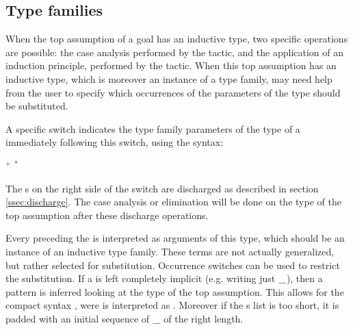 \subsection{Type families}\label{ssec:typefam}

When the top assumption of a goal has an inductive type, two
specific operations are possible: the case analysis performed by the
 tactic, and the application of an induction principle,
performed by the  tactic. When this top assumption has an
inductive type, which is moreover an instance of a type family, \Coq{}
may need help from the user to specify which occurrences of the parameters
of the type should be substituted.

A specific \ssrC{/} switch indicates the type family parameters of the
type of a \ditem{} immediately following this \ssrC{/} switch, using the
syntax:

\begin{center}
 \ssrC{[}  {\optsep}  \ssrC{]:} $^+$ \ssrC{/} $^*$
\end{center}

The s on the right side of the \ssrC{/} switch are discharged
as described in section \ref{ssec:discharge}. The case analysis or
elimination will be done on the type of the top assumption after these
discharge operations.

Every  preceding the \ssrC{/} is interpreted as arguments of this
type, which should be an instance of an inductive type family. These terms are
not actually generalized, but rather selected for substitution. Occurrence
switches can be used to restrict the substitution.  If a {\term} is left
completely implicit (e.g. writing just $\ssrC{\_}$), then a pattern is inferred
looking at the type of the top assumption.  This allows for the compact syntax
, were \ssrC{\_} is interpreted as \ssrC{(\_ == \_)}. Moreover
if the s list is too short, it is padded with an initial
sequence of $\ssrC{\_}$ of the right length.

